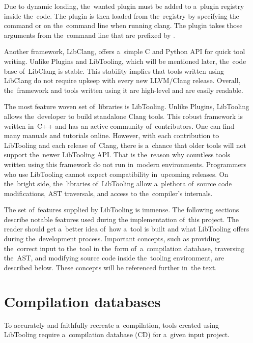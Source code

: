 Due to dynamic loading, the~wanted plugin must be added to a~plugin registry 
inside the~code.
The plugin is then loaded from the~registry by specifying the~ 
command or  on the~command line when running clang.
The plugin takes those arguments from the~command line that are prefixed 
by .

Another framework, LibClang, offers a~simple C and Python API for quick 
tool writing. 
Unlike Plugins and LibTooling, which will be mentioned later, the~code 
base of~LibClang is stable. 
This stability implies that tools written using LibClang do not require
upkeep with every new LLVM/Clang release. 
Overall, the~framework and tools written using it are high-level and 
are easily readable.

The most feature woven set of~libraries is LibTooling. 
Unlike Plugins, LibTooling \citep{libtooling:online} 
allows the~developer to build standalone 
Clang tools. 
This robust framework is written in~C++ and has an active 
community of~contributors. 
One can find many manuals and tutorials online. 
However, with each contribution to LibTooling and each release of~Clang, 
there is a~chance that older tools will not support the~newer LibTooling 
API. 
That is the~reason why countless tools written using this framework do not
run in~modern environments. 
Programmers who use LibTooling cannot expect compatibility in~upcoming 
releases. 
On the~bright side, the~libraries of~LibTooling allow a~plethora of~source
code modifications, AST traversals, and access to the~compiler's internals.

The set of~features supplied by LibTooling is immense. 
The following sections describe notable features used during 
the implementation of~this project. 
The reader should get a~better idea of~how a~tool is built and what 
LibTooling offers during the~development process. 
Important concepts, such as providing the~correct input to the~tool 
in the~form of~a~compilation database, traversing the~AST, 
and modifying source code inside the~tooling environment, 
are described below. 
These concepts will be referenced further in~the text.

\section{Compilation databases}

To accurately and faithfully recreate a~compilation, tools created using 
LibTooling require a~compilation database (CD) \citep{cd:online} 
for a~given input project.

